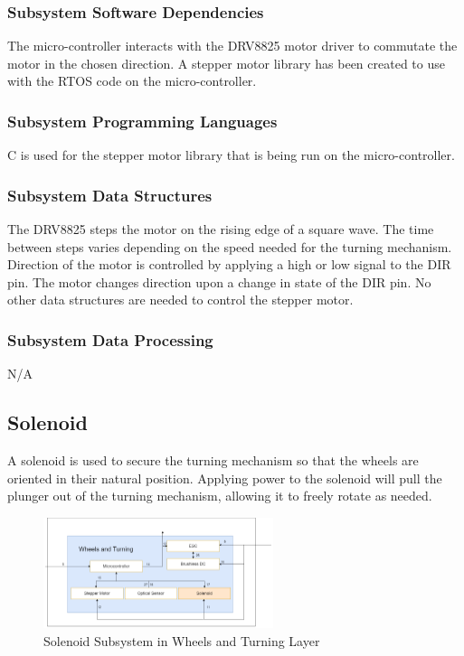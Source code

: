 \subsubsection{Subsystem Software Dependencies}
The micro-controller interacts with the DRV8825 motor driver to commutate the motor in the chosen direction. A stepper motor library has been created to use with the RTOS code on the micro-controller.

\subsubsection{Subsystem Programming Languages}
C is used for the stepper motor library that is being run on the micro-controller.

\subsubsection{Subsystem Data Structures}
The DRV8825 steps the motor on the rising edge of a square wave. The time between steps varies depending on the speed needed for the turning mechanism. Direction of the motor is controlled by applying a high or low signal to the DIR pin. The motor changes direction upon a change in state of the DIR pin. No other data structures are needed to control the stepper motor.

\subsubsection{Subsystem Data Processing}
N/A

\subsection{Solenoid}
A solenoid is used to secure the turning mechanism so that the wheels are oriented in their natural position. Applying power to the solenoid will pull the plunger out of the turning mechanism, allowing it to freely rotate as needed.

\begin{figure}[h!]
	\centering
 	\includegraphics[width=0.60\textwidth]{images/Keaton/Solenoid.png}
 \caption{Solenoid Subsystem in Wheels and Turning Layer}
\end{figure}

